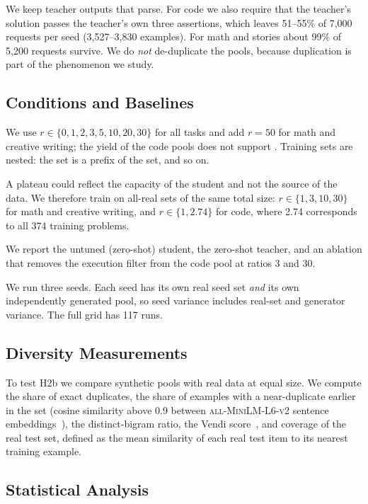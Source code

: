  We keep teacher outputs that parse. For code we also require that the teacher's solution passes the teacher's own three assertions, which leaves 51--55\% of 7,000 requests per seed (3,527--3,830 examples). For math and stories about 99\% of 5,200 requests survive. We do \emph{not} de-duplicate the pools, because duplication is part of the phenomenon we study.

\subsection{Conditions and Baselines}

 We use $r \in \{0, 1, 2, 3, 5, 10, 20, 30\}$ for all tasks and add $r = 50$ for math and creative writing; the yield of the code pools does not support . Training sets are nested: the  set is a prefix of the  set, and so on.

 A plateau could reflect the capacity of the student and not the source of the data. We therefore train on all-real sets of the same total size: $r \in \{1, 3, 10, 30\}$ for math and creative writing, and $r \in \{1, 2.74\}$ for code, where 2.74 corresponds to all 374 \mbpp training problems.

 We report the untuned (zero-shot) student, the zero-shot teacher, and an ablation that removes the execution filter from the code pool at ratios 3 and 30.

 We run three seeds. Each seed has its own real seed set \emph{and} its own independently generated pool, so seed variance includes real-set and generator variance. The full grid has 117 runs.

\subsection{Diversity Measurements}

To test H2b we compare synthetic pools with real data at equal size.
We compute the share of exact duplicates, the share of examples with a near-duplicate earlier in the set (cosine similarity above 0.9 between \textsc{all-MiniLM-L6-v2} sentence embeddings~\citep{reimers2019sentence}), the distinct-bigram ratio, the Vendi score~\citep{friedman2023vendi}, and coverage of the real test set, defined as the mean similarity of each real test item to its nearest training example.

\subsection{Statistical Analysis}

